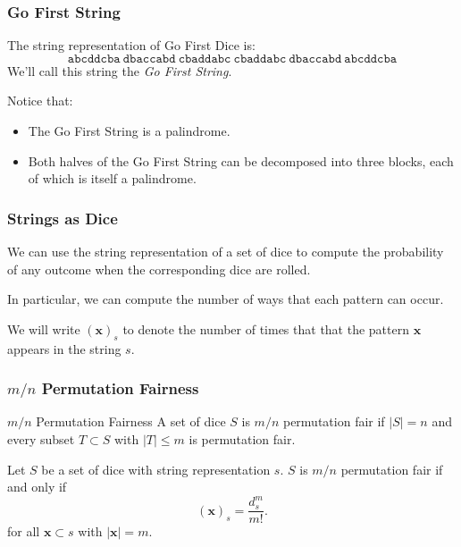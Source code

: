 \documentclass[aspectratio=169]{beamer}
\begin{document}
\begin{frame}[triangle=siiblue]
\frametitle{Go First String}
The string representation of Go First Dice is:
\begin{equation*}
	\texttt{abcddcba} \ \texttt{dbaccabd} \ \texttt{cbaddabc} \  \texttt{cbaddabc} \ \texttt{dbaccabd} \ \texttt{abcddcba}
\end{equation*}
We'll call this string the \emph{Go First String}.

\vfill

Notice that:
\begin{itemize}
	\item The Go First String is a palindrome.  
	\item Both halves of the Go First String can be decomposed into three blocks, each of which is itself a palindrome.
\end{itemize}
\end{frame}

\begin{frame}[triangle=siiblue]
\frametitle{Strings as Dice}
We can use the string representation of a set of dice to compute the probability of any outcome when the corresponding dice are rolled.

\vfill

In particular, we can compute the number of ways that each pattern can occur.

\vfill

We will write $(\mathbf{x})_s$ to denote the number of times that that the pattern $\mathbf{x}$ appears in the string $s$.

\end{frame}

\begin{frame}[triangle=siiblue]
\frametitle{$m/n$ Permutation Fairness}
\begin{siidefinition}{$m/n$ Permutation Fairness}{}
	A set of dice $S$ is $m/n$ permutation fair if $|S| = n$ and every subset $T \subset S$ with $|T| \leq m$ is permutation fair.
\end{siidefinition}

\vfill

\begin{siilemma}[label=perm_fair_counts]{}{}
Let $S$ be a set of dice with string representation $s$.  $S$ is $m/n$ permutation fair if and only if
\begin{equation*}
(\mathbf{x})_s = \frac{d_s^m}{m!}.
\end{equation*}
for all $\mathbf{x} \subset s$ with $|\mathbf{x}| = m$.
\end{siilemma}
\end{frame}
\end{document}
